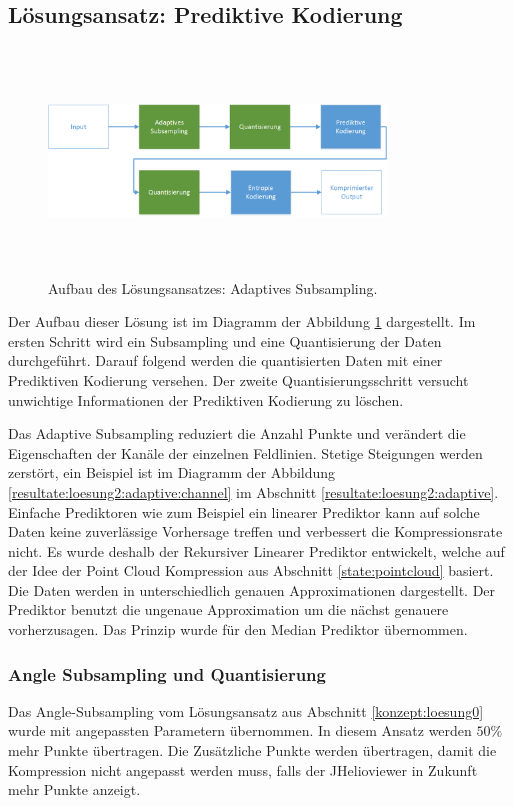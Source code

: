 \subsection{Lösungsansatz: Prediktive Kodierung} \label{konzept:prediktiv}
\begin{figure}[!htbp]
	\center
	\includegraphics[width=0.8\textwidth,height=6cm,keepaspectratio]{./pictures/konzept/solution2/aufbau.png}
	\caption{Aufbau des Lösungsansatzes: Adaptives Subsampling.}
	\label{konzept:loesung2:aufbau}
\end{figure}
Der Aufbau dieser Lösung ist im Diagramm der Abbildung \ref{konzept:loesung2:aufbau} dargestellt. Im ersten Schritt wird ein Subsampling und eine Quantisierung der Daten durchgeführt. Darauf folgend werden die quantisierten Daten mit einer Prediktiven Kodierung versehen. Der zweite Quantisierungsschritt versucht unwichtige Informationen der Prediktiven Kodierung zu löschen. 

Das Adaptive Subsampling reduziert die Anzahl Punkte und verändert die Eigenschaften der Kanäle der einzelnen Feldlinien. Stetige Steigungen werden zerstört, ein Beispiel ist im Diagramm der Abbildung \ref{resultate:loesung2:adaptive:channel} im Abschnitt \ref{resultate:loesung2:adaptive}. Einfache Prediktoren wie zum Beispiel ein linearer Prediktor kann auf solche Daten keine zuverlässige Vorhersage treffen und verbessert die Kompressionsrate nicht. Es wurde deshalb der Rekursiver Linearer Prediktor entwickelt, welche auf der Idee der Point Cloud Kompression aus Abschnitt \ref{state:pointcloud} basiert. Die Daten werden in unterschiedlich genauen Approximationen dargestellt. Der Prediktor benutzt die ungenaue Approximation um die nächst genauere vorherzusagen. Das Prinzip wurde für den Median Prediktor übernommen.

\subsubsection{Angle Subsampling und Quantisierung}
Das Angle-Subsampling vom Lösungsansatz aus Abschnitt \ref{konzept:loesung0} wurde mit angepassten Parametern übernommen. In diesem Ansatz werden $50\%$ mehr Punkte übertragen. Die Zusätzliche Punkte werden übertragen, damit die Kompression nicht angepasst werden muss, falls der JHelioviewer in Zukunft mehr Punkte anzeigt.


